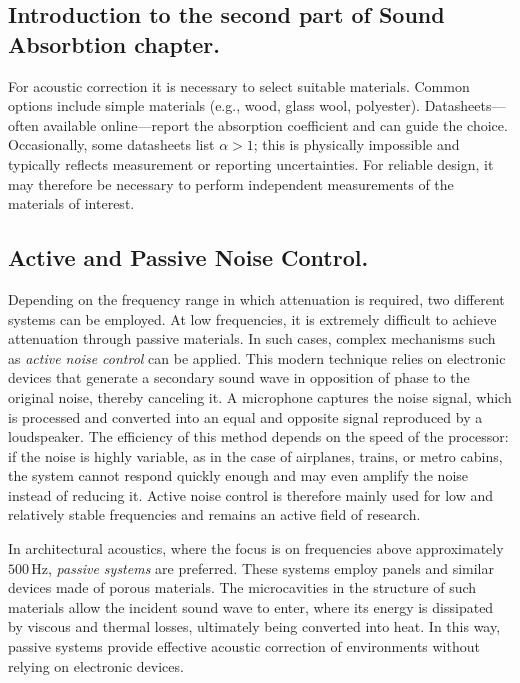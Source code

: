 \subsection{Introduction to the second part of Sound Absorbtion chapter.}

For acoustic correction it is necessary to select suitable materials. Common options include simple materials (e.g., wood, glass wool, polyester). Datasheets—often available online—report the absorption coefficient and can guide the choice. Occasionally, some datasheets list \(\alpha>1\); this is physically impossible and typically reflects measurement or reporting uncertainties. For reliable design, it may therefore be necessary to perform independent measurements of the materials of interest.

\subsection{Active and Passive Noise Control.}

Depending on the frequency range in which attenuation is required, two different systems can be employed. At low frequencies, it is extremely difficult to achieve attenuation through passive materials. In such cases, complex mechanisms such as \emph{active noise control} can be applied. This modern technique relies on electronic devices that generate a secondary sound wave in opposition of phase to the original noise, thereby canceling it. A microphone captures the noise signal, which is processed and converted into an equal and opposite signal reproduced by a loudspeaker. The efficiency of this method depends on the speed of the processor: if the noise is highly variable, as in the case of airplanes, trains, or metro cabins, the system cannot respond quickly enough and may even amplify the noise instead of reducing it. Active noise control is therefore mainly used for low and relatively stable frequencies and remains an active field of research.

In architectural acoustics, where the focus is on frequencies above approximately \(500\,\text{Hz}\), \emph{passive systems} are preferred. These systems employ panels and similar devices made of porous materials. The microcavities in the structure of such materials allow the incident sound wave to enter, where its energy is dissipated by viscous and thermal losses, ultimately being converted into heat. In this way, passive systems provide effective acoustic correction of environments without relying on electronic devices.


